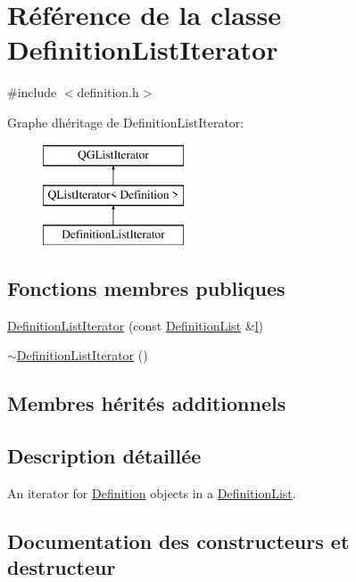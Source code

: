 \hypertarget{class_definition_list_iterator}{}\section{Référence de la classe Definition\+List\+Iterator}
\label{class_definition_list_iterator}


{\ttfamily \#include $<$definition.\+h$>$}

Graphe d\textquotesingle{}héritage de Definition\+List\+Iterator\+:\begin{figure}[H]
\begin{center}
\leavevmode
\includegraphics[height=3.000000cm]{class_definition_list_iterator}
\end{center}
\end{figure}
\subsection*{Fonctions membres publiques}
\begin{DoxyCompactItemize}
\item 
\hyperlink{class_definition_list_iterator_ac6b954bf1835c10d27c1c8b965719866}{Definition\+List\+Iterator} (const \hyperlink{class_definition_list}{Definition\+List} \&\hyperlink{060__command__switch_8tcl_aff56f84b49947b84b2a304f51cf8e678}{l})
\item 
\hyperlink{class_definition_list_iterator_a14c1a37f10bf94c4532bd08fe316e2df}{$\sim$\+Definition\+List\+Iterator} ()
\end{DoxyCompactItemize}
\subsection*{Membres hérités additionnels}


\subsection{Description détaillée}
An iterator for \hyperlink{class_definition}{Definition} objects in a \hyperlink{class_definition_list}{Definition\+List}. 

\subsection{Documentation des constructeurs et destructeur}
\hypertarget{class_definition_list_iterator_ac6b954bf1835c10d27c1c8b965719866}{}
